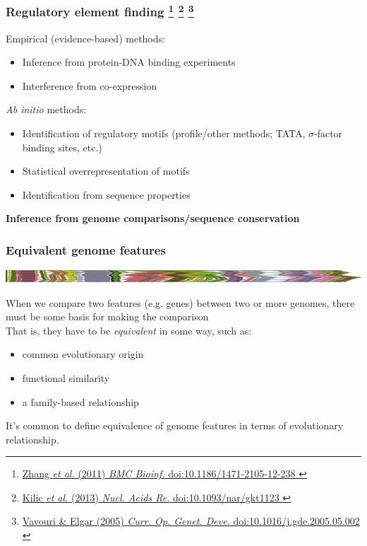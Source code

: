 %
\begin{frame}
  \frametitle{Regulatory element finding
  \footnote{\tiny{\href{http://dx.doi.org/10.1186/1471-2105-12-238
}{Zhang \textit{et al.} (2011) \textit{BMC Bioinf.} doi:10.1186/1471-2105-12-238
}}}
    \footnote{\tiny{\href{http://dx.doi.org/10.1093/nar/gkt1123
}{Kilic \textit{et al.} (2013) \textit{Nucl. Acids Re.} doi:10.1093/nar/gkt1123
}}}
    \footnote{\tiny{\href{http://dx.doi.org/10.1016/j.gde.2005.05.002
}{Vavouri \& Elgar (2005) \textit{Curr. Op. Genet. Deve.} doi:10.1016/j.gde.2005.05.002
}}}
    }
  \textcolor{hutton_green}{Empirical (evidence-based) methods:}
  \begin{itemize}
    \item Inference from protein-DNA binding experiments
    \item Interference from co-expression
  \end{itemize}
  \textcolor{hutton_blue}{\textit{Ab initio} methods:}
  \begin{itemize}
    \item Identification of regulatory motifs (profile/other methods; TATA, $\sigma$-factor binding sites, etc.)
    \item Statistical overrepresentation of motifs
    \item Identification from sequence properties
  \end{itemize}
  \textcolor{hutton_purple}{\textbf{Inference from genome comparisons/sequence conservation}}
\end{frame}

\begin{frame}
  \frametitle{Equivalent genome features}
  \begin{center}
    \includegraphics[width=1\textwidth]{images/collinear_zeae}  
  \end{center}
  When we compare two features (e.g. genes) between two or more genomes, there must be some basis for making the comparison \\
  That is, they have to be \textit{equivalent} in some way, such as:
  \begin{itemize}
    \item common evolutionary origin
    \item functional similarity
    \item a family-based relationship
  \end{itemize}
  It's common to define equivalence of genome features in terms of evolutionary relationship.
\end{frame}

